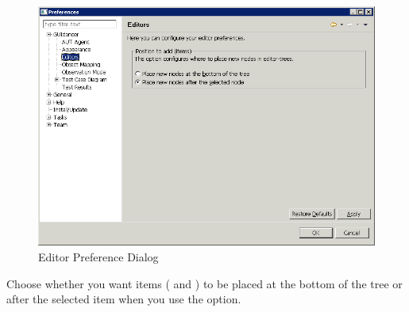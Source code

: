 \label{editorprefs}


\begin{figure}[h]
\begin{center}
\includegraphics[width=12.5cm]{Tasks/Preferences/PS/editorprefs1}
\caption{Editor Preference Dialog}
\label{editorprefs}
\end{center}
\end{figure}


Choose whether you want items (\gdcases{} and \gdsteps{}) to be placed at the bottom of the tree or after the selected item when you use the  option. 


